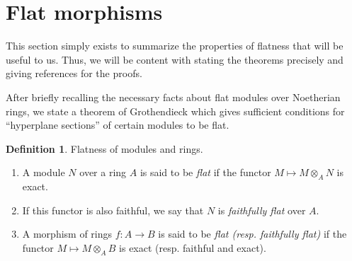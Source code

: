 \documentclass{stacks-project}
\theoremstyle{plain}
\theoremstyle{definition}
\newtheorem{definition}[subsection]{Definition}
\theoremstyle{remark}
\numberwithin{equation}{subsection}
\begin{document}
\section{Flat morphisms}
\label{section-flat-morphisms}

\noindent
This section simply exists to summarize the properties of flatness that will
be useful to us. Thus, we will be content with stating the theorems precisely
and giving references for the proofs.

\medskip\noindent
After briefly recalling the necessary facts about flat modules over Noetherian
rings, we state a theorem of Grothendieck which gives sufficient conditions
for ``hyperplane sections'' of certain modules to be flat.

\begin{definition}
\label{definition-flat-rings}
Flatness of modules and rings.
\begin{enumerate}
\item A module $N$ over a ring $A$ is said to be {\it flat}
if the functor $M \mapsto M \otimes_A N$ is exact.
\item If this functor is also faithful, we say that
$N$ is {\it faithfully flat} over $A$.
\item A morphism of rings $f : A \to B$ is said to be
{\it flat (resp. faithfully flat)}
if the functor $M \mapsto M \otimes_A B$ is exact
(resp. faithful and exact).
\end{enumerate}
\end{definition}
\end{document}
